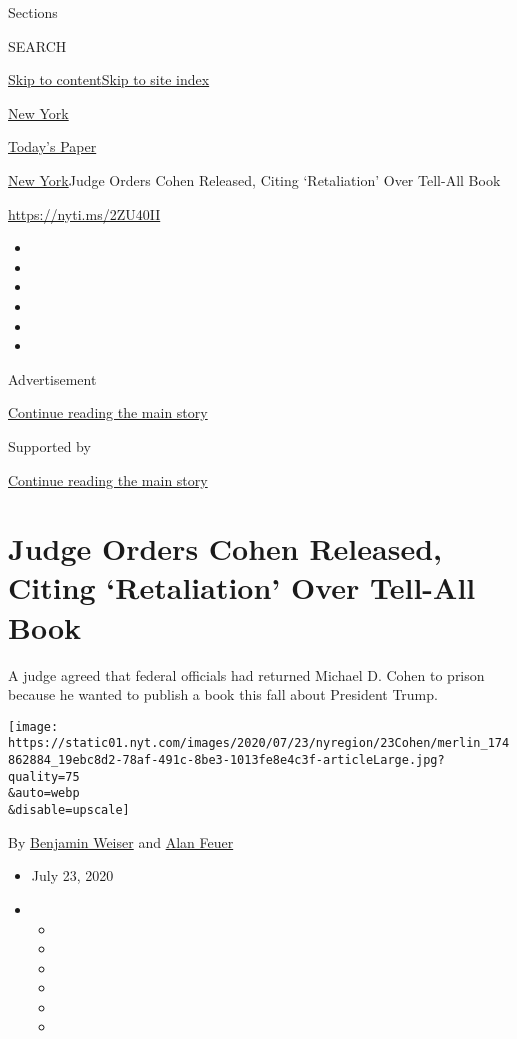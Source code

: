 Sections

SEARCH

\protect\hyperlink{site-content}{Skip to
content}\protect\hyperlink{site-index}{Skip to site index}

\href{https://www.nytimes.com/section/nyregion}{New York}

\href{https://myaccount.nytimes.com/auth/login?response_type=cookie\&client_id=vi}{}

\href{https://www.nytimes.com/section/todayspaper}{Today's Paper}

\href{/section/nyregion}{New York}\textbar{}Judge Orders Cohen Released,
Citing `Retaliation' Over Tell-All Book

\url{https://nyti.ms/2ZU40II}

\begin{itemize}
\item
\item
\item
\item
\item
\item
\end{itemize}

Advertisement

\protect\hyperlink{after-top}{Continue reading the main story}

Supported by

\protect\hyperlink{after-sponsor}{Continue reading the main story}

\hypertarget{judge-orders-cohen-released-citing-retaliation-over-tell-all-book}{%
\section{Judge Orders Cohen Released, Citing `Retaliation' Over Tell-All
Book}\label{judge-orders-cohen-released-citing-retaliation-over-tell-all-book}}

A judge agreed that federal officials had returned Michael D. Cohen to
prison because he wanted to publish a book this fall about President
Trump.

\texttt{[image: https://static01.nyt.com/images/2020/07/23/nyregion/23Cohen/merlin\_174862884\_19ebc8d2-78af-491c-8be3-1013fe8e4c3f-articleLarge.jpg?quality=75\\\&auto=webp\\\&disable=upscale]}

By \href{https://www.nytimes.com/by/benjamin-weiser}{Benjamin Weiser}
and \href{https://www.nytimes.com/by/alan-feuer}{Alan Feuer}

\begin{itemize}
\item
  July 23, 2020
\item
  \begin{itemize}
  \item
  \item
  \item
  \item
  \item
  \item
  \end{itemize}
\end{itemize}

